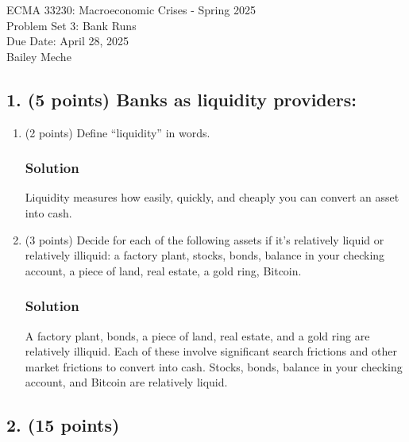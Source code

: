 \documentclass[12pt]{article}
\begin{document}
	\begin{center}
		ECMA 33230: Macroeconomic Crises - Spring 2025\\
        Problem Set 3: Bank Runs \\
		Due Date: April 28, 2025 \\
        Bailey Meche
	\end{center}

\subsection*{1. (5 points) Banks as liquidity providers:}

\begin{enumerate}[label=(\alph*)]
    \item (2 points) Define ``liquidity'' in words.
    \subsubsection*{Solution}

    Liquidity measures how easily, quickly, and cheaply you can convert an asset into cash. 

    \item (3 points) Decide for each of the following assets if it’s relatively liquid or relatively illiquid: a factory plant, stocks, bonds, balance in your checking account, a piece of land, real estate, a gold ring, Bitcoin.
     \subsubsection*{Solution}

     A factory plant, bonds,  a piece of land, real estate, and a gold ring are relatively illiquid. Each of these involve significant search frictions and other market frictions to convert into cash.  Stocks, bonds, balance in your checking account, and Bitcoin are relatively liquid. 
     
     
\end{enumerate}

\subsection*{2. (15 points)}
\end{document}
